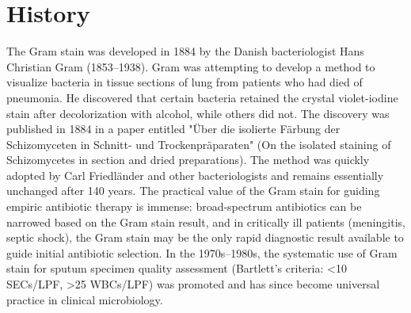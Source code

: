 \section*{History}
The Gram stain was developed in 1884 by the Danish bacteriologist Hans Christian Gram (1853--1938). Gram was attempting to develop a method to visualize bacteria in tissue sections of lung from patients who had died of pneumonia. He discovered that certain bacteria retained the crystal violet-iodine stain after decolorization with alcohol, while others did not. The discovery was published in 1884 in a paper entitled "Über die isolierte Färbung der Schizomyceten in Schnitt- und Trockenpräparaten" (On the isolated staining of Schizomycetes in section and dried preparations). The method was quickly adopted by Carl Friedländer and other bacteriologists and remains essentially unchanged after 140 years. The practical value of the Gram stain for guiding empiric antibiotic therapy is immense: broad-spectrum antibiotics can be narrowed based on the Gram stain result, and in critically ill patients (meningitis, septic shock), the Gram stain may be the only rapid diagnostic result available to guide initial antibiotic selection. In the 1970s--1980s, the systematic use of Gram stain for sputum specimen quality assessment (Bartlett's criteria: <10 SECs/LPF, >25 WBCs/LPF) was promoted and has since become universal practice in clinical microbiology.

